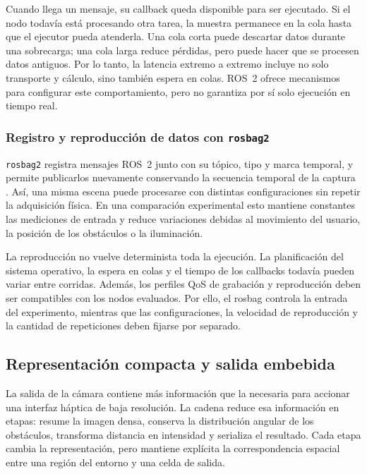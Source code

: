 Cuando llega un mensaje, su callback queda disponible para ser ejecutado. Si el nodo todavía está
procesando otra tarea, la muestra permanece en la cola hasta que el ejecutor pueda atenderla. Una
cola corta puede descartar datos durante una sobrecarga; una cola larga reduce pérdidas, pero puede
hacer que se procesen datos antiguos. Por lo tanto, la latencia extremo a extremo incluye no solo
transporte y cálculo, sino también espera en colas. ROS~2 ofrece mecanismos para configurar este
comportamiento, pero no garantiza por sí solo ejecución en tiempo real.

\subsubsection{Registro y reproducción de datos con \texttt{rosbag2}}

\texttt{rosbag2} registra mensajes ROS~2 junto con su tópico, tipo y marca temporal, y permite
publicarlos nuevamente conservando la secuencia temporal de la captura \cite{ROS2Bag}. Así, una
misma escena puede procesarse con distintas configuraciones sin repetir la adquisición física. En
una comparación experimental esto mantiene constantes las mediciones de entrada y reduce
variaciones debidas al movimiento del usuario, la posición de los obstáculos o la iluminación.

La reproducción no vuelve determinista toda la ejecución. La planificación del sistema operativo,
la espera en colas y el tiempo de los callbacks todavía pueden variar entre corridas. Además, los
perfiles QoS de grabación y reproducción deben ser compatibles con los nodos evaluados. Por ello,
el rosbag controla la entrada del experimento, mientras que las configuraciones, la velocidad de
reproducción y la cantidad de repeticiones deben fijarse por separado.

\subsection{Representación compacta y salida embebida}
\label{sec:mt-representacion-compacta}

La salida de la cámara contiene más información que la necesaria para accionar una interfaz
háptica de baja resolución. La cadena reduce esa información en etapas: resume la imagen densa,
conserva la distribución angular de los obstáculos, transforma distancia en intensidad y
serializa el resultado. Cada etapa cambia la representación, pero mantiene explícita la
correspondencia espacial entre una región del entorno y una celda de salida.

